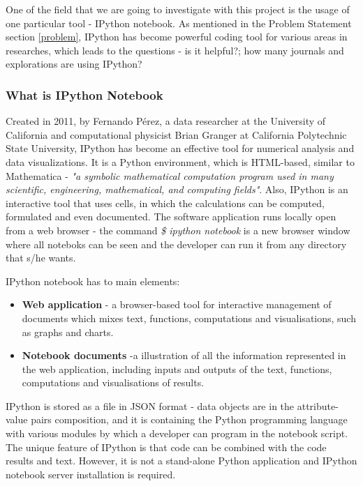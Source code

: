 
One of the field that we are going to investigate with this project is the usage of one particular tool - IPython notebook. As mentioned in the Problem Statement section \ref{problem}, IPython has become powerful coding tool for various areas in researches, which leads to the questions - is it helpful?; how many journals and explorations are using IPython? 

\subsubsection{What is IPython Notebook}
\label{definition}

Created in 2011, by Fernando Pérez, a data researcher at the University of California and computational physicist Brian Granger at California Polytechnic State University, IPython has become an effective tool for numerical analysis and data visualizations.\cite{shen2014interactive} It is a Python environment, which is HTML-based, similar to Mathematica - \textit{"a symbolic mathematical computation program used in many scientific, engineering, mathematical, and computing fields"}. \cite{mathematicaWiki} \cite{mathematicaWolfram} Also, IPython is an interactive tool that uses cells, in which the calculations can be computed, formulated and even documented. The software application runs locally open from a web browser - the command \textit{\$ ipython notebook} is a new browser window where all noteboks can be seen and the developer can run it from any directory that s/he wants.  \cite{johansson2014introduction}

IPython notebook has to main elements:\cite{ipythonFeatures}

\begin{itemize}
\item \textbf{Web application} - a browser-based tool for interactive management of documents which mixes text, functions, computations and visualisations, such as graphs and charts. 
\item \textbf{Notebook documents} -a illustration of all the information represented in the web application, including inputs and outputs of the text, functions, computations and visualisations of results.
\end{itemize}

IPython is stored as a file in JSON format - data objects are in the attribute-value pairs composition, and it is containing the Python programming language with various modules by which a developer can program in the notebook script. The unique feature of IPython is that code can be combined with the code results and text. However, it is not a stand-alone Python application and IPython notebook server installation is required.

